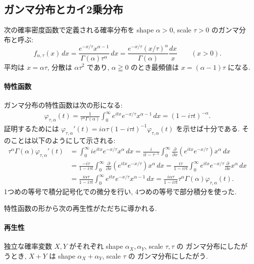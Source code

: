 \documentclass[12pt,twoside]{jarticle}
\renewcommand\d{\partial}
\theoremstyle{jplain}
\theoremstyle{jplain}
\theoremstyle{jplain}
\numberwithin{theorem}{section}
\numberwithin{equation}{section}
\numberwithin{figure}{section}
\numberwithin{table}{section}
\begin{document}

\subsection{ガンマ分布とカイ2乗分布}
\label{sec:Gamma}

次の確率密度函数で定義される確率分布を
shape $\alpha>0$, scale $\tau>0$ のガンマ分布と呼ぶ:
\[
f_{\alpha,\tau}(x)\,dx
=\frac{e^{-x/\tau}x^{\alpha-1}}{\Gamma(\alpha)\tau^\alpha}\,dx
=\frac{e^{-x/\tau}(x/\tau)^\alpha}{\Gamma(\alpha)}\frac{dx}{x}
\qquad (x>0).
\]
平均は $x=\alpha\tau$, 分散は $\alpha\tau^2$ であり,
$\alpha\geqq 0$ のとき最頻値は $x=(\alpha-1)\tau$ になる.

\paragraph{特性函数}
ガンマ分布の特性函数は次の形になる:
\begin{align*}
\varphi_{\tau,\alpha}(t)
=\frac{1}{\tau^\alpha\Gamma(\alpha)}\int_0^\infty e^{itx}e^{-x/\tau}x^{\alpha-1}\,dx
=(1-i\tau t)^{-\alpha}.
\end{align*}
証明するためには $\varphi_{\tau,\alpha}'(t)=i\alpha\tau(1-i\tau t)^{-1}\varphi_{\tau,\alpha}(t)$
を示せば十分である. そのことは以下のようにして示される:
\begin{align*}
\tau^\alpha\Gamma(\alpha)\varphi_{\tau,\alpha}'(t)
&
=\int_0^\infty i e^{itx} e^{-x/\tau} x^\alpha\,dx
= \frac{i}{it-\tau^{-1}}
\int_0^\infty \frac{\d}{\d x}(e^{itx} e^{-x/\tau}) x^\alpha\,dx
\\ &
=\frac{-i\tau}{1-i\tau t}
\int_0^\infty \frac{\d}{\d x}(e^{itx} e^{-x/\tau}) x^\alpha\,dx
=\frac{i\tau}{1-i\tau t}
\int_0^\infty  e^{itx} e^{-x/\tau} \frac{\d}{\d x}x^\alpha\,dx
\\ &
=\frac{i\alpha\tau}{1-i\tau t}
\int_0^\infty  e^{itx} e^{-x/\tau} x^{\alpha-1}\,dx
=\frac{i\alpha\tau}{1-i\tau t}
\tau^\alpha\Gamma(\alpha)\varphi_{\tau,\alpha}(t).
\end{align*}
1つめの等号で積分記号化での微分を行い,
4つめの等号で部分積分を使った.

特性函数の形から次の再生性がただちに導かれる.

\paragraph{再生性}
独立な確率変数 $X,Y$ がそれぞれ shape $\alpha_X,\alpha_Y$, scale $\tau,\tau$ の
ガンマ分布にしたがうとき, $X+Y$ は shape $\alpha_X+\alpha_Y$, scale $\tau$ の
ガンマ分布にしたがう.
\end{document}
